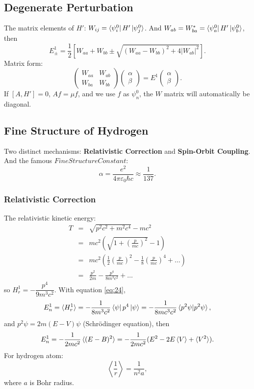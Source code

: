 \documentclass[12pt, 
]{article}
\begin{document}
\subsection{Degenerate Perturbation}
The matrix elements of $H'$: $W_{ij}=\bra{\psi_i^0}H'\ket{\psi_j^0}$. And $W_{ab}=W_{ba}^*=\bra{\psi^0_a}H'\ket{\psi_b^0}$, then
\[
	E^1_\pm=\frac{1}{2}\left[W_{aa}+W_{bb}\pm\sqrt{(W_{aa}-W_{bb})^2+4|W_{ab}|^2}\right].
\]
Matrix form:
\[
	\begin{pmatrix}
		W_{aa}&W_{ab}\\W_{ba}&W_{bb}
	\end{pmatrix} \begin{pmatrix}
		\alpha\\\beta
	\end{pmatrix}=E^1 \begin{pmatrix}
		\alpha\\\beta
	\end{pmatrix}.
\]
If $[A,H']=0$, $Af=\mu f$, and we use $f$ as $\psi_n^0$, the $W$ matrix will automatically be diagonal.
~\\

\subsection{Fine Structure of Hydrogen}
Two distinct mechanisms: {\bf Relativistic Correction} and {\bf Spin-Orbit Coupling}. And the famous $Fine Structure Constant$:
\[
	\alpha=\frac{e^2}{4\pi\varepsilon_0\hbar c}\approx\frac{1}{137}.
\]
\subsubsection{Relativistic Correction}
The relativistic kinetic energy:
\begin{eqnarray*}
	T&=&\sqrt{p^2 c^2+m^2c^4}-mc^2\\
	&=&mc^2(\sqrt{1+\left(\frac{p}{mc}\right)^2}-1)\\
	&=&mc^2(\frac{1}{2}\left(\frac{p}{mc}\right)^2-\frac{1}{8}\left(\frac{p}{mc}\right)^4+\dots)\\
	&=&\frac{p^2}{2m}-\frac{p^4}{8m^3c^2}+\dots
\end{eqnarray*}
so $H^1_r=-\dfrac{p^4}{9m^3c^2}$. With equation \eqref{eq:24},
\[
	E_n^1=\braket{H_r^1}=-\frac{1}{8m^3c^2}\bra{\psi}p^4\ket{\psi}=-\frac{1}{8mc^3c^2}\braket{p^2\psi|p^2\psi},
\]
and $p^2\psi=2m(E-V)\psi$ (Schr\"odinger equation), then
\[
	E^1_n=-\frac{1}{2mc^2}\braket{(E-B)^2}=-\frac{1}{2mc^2}(E^2-2E\braket{V}+\braket{V^2}).
\]
For hydrogen atom:
\[
	\left<\frac{1}{r}\right>=\frac{1}{n^2a},
\]
where $a$ is Bohr radius.
~\\
\end{document}
